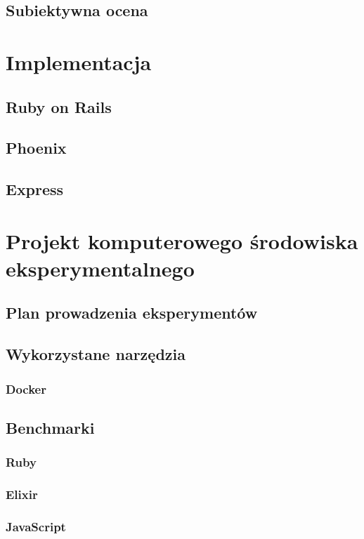\documentclass[mgr,oneside]{mgr}
\begin{document}
\section{Subiektywna ocena}

\chapter{Implementacja}
\section{Ruby on Rails}
\section{Phoenix}
\section{Express}

\chapter{Projekt komputerowego środowiska eksperymentalnego}
\section{Plan prowadzenia eksperymentów}

\section{Wykorzystane narzędzia}
\subsection{Docker}
\section{Benchmarki}
\subsection{Ruby}
\subsection{Elixir}
\subsection{JavaScript}
\end{document}
